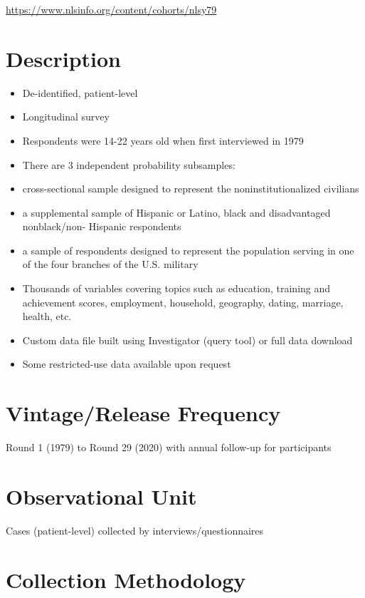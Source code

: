 \documentclass[
]{book}
\providecommand{\tightlist}{%
  \setlength{\itemsep}{0pt}\setlength{\parskip}{0pt}}
\begin{document}
\url{https://www.nlsinfo.org/content/cohorts/nlsy79}

\hypertarget{description-57}{%
\section{Description}\label{description-57}}

\begin{itemize}
\tightlist
\item
  De-identified, patient-level
\item
  Longitudinal survey
\item
  Respondents were 14-22 years old when first interviewed in 1979
\item
  There are 3 independent probability subsamples:
\item
  cross-sectional sample designed to represent the noninstitutionalized civilians
\item
  a supplemental sample of Hispanic or Latino, black and disadvantaged nonblack/non- Hispanic respondents
\item
  a sample of respondents designed to represent the population serving in one of the four branches of the U.S. military
\item
  Thousands of variables covering topics such as education, training and achievement scores, employment, household, geography, dating, marriage, health, etc.
\item
  Custom data file built using Investigator (query tool) or full data download
\item
  Some restricted-use data available upon request
\end{itemize}

\hypertarget{vintagerelease-frequency-57}{%
\section{Vintage/Release Frequency}\label{vintagerelease-frequency-57}}

Round 1 (1979) to Round 29 (2020) with annual follow-up for participants

\hypertarget{observational-unit-57}{%
\section{Observational Unit}\label{observational-unit-57}}

Cases (patient-level) collected by interviews/questionnaires

\hypertarget{collection-methodology-57}{%
\section{Collection Methodology}\label{collection-methodology-57}}
\end{document}

